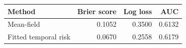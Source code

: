 \begin{tabular}{lrrr}\toprule
Method & Brier score & Log loss & AUC\\ \midrule
Mean-field & 0.1052 & 0.3500 & 0.6132\\
Fitted temporal risk & 0.0670 & 0.2558 & 0.6179\\
\bottomrule\end{tabular}
